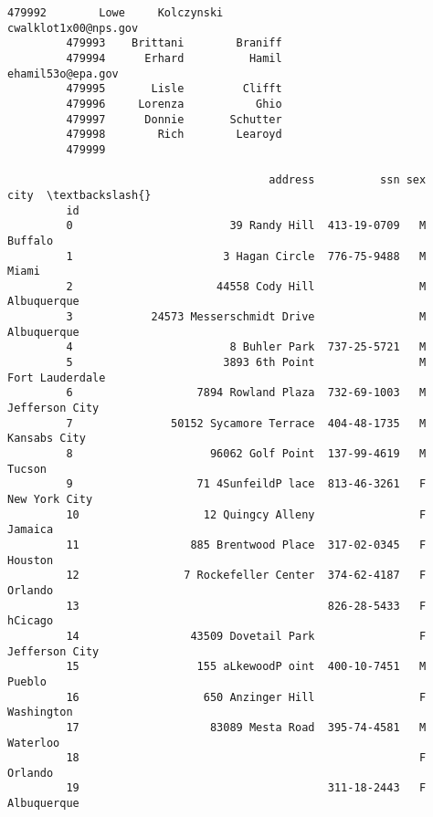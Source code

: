 \documentclass[11pt]{article}
\begin{document}
\begin{Verbatim}[commandchars=\\\{\}]
         479992        Lowe     Kolczynski                      cwalklot1x00@nps.gov   
         479993    Brittani        Braniff                                             
         479994      Erhard          Hamil                         ehamil53o@epa.gov   
         479995       Lisle         Clifft                                             
         479996     Lorenza           Ghio                                             
         479997      Donnie       Schutter                                             
         479998        Rich        Learoyd                                             
         479999                                                                        
         
                                        address          ssn sex              city  \textbackslash{}
         id                                                                          
         0                        39 Randy Hill  413-19-0709   M           Buffalo   
         1                       3 Hagan Circle  776-75-9488   M             Miami   
         2                      44558 Cody Hill                M       Albuquerque   
         3            24573 Messerschmidt Drive                M       Albuquerque   
         4                        8 Buhler Park  737-25-5721   M                     
         5                       3893 6th Point                M   Fort Lauderdale   
         6                   7894 Rowland Plaza  732-69-1003   M    Jefferson City   
         7               50152 Sycamore Terrace  404-48-1735   M      Kansabs City   
         8                     96062 Golf Point  137-99-4619   M            Tucson   
         9                   71 4SunfeildP lace  813-46-3261   F     New York City   
         10                   12 Quingcy Alleny                F           Jamaica   
         11                 885 Brentwood Place  317-02-0345   F           Houston   
         12                7 Rockefeller Center  374-62-4187   F           Orlando   
         13                                      826-28-5433   F           hCicago   
         14                 43509 Dovetail Park                F    Jefferson City   
         15                  155 aLkewoodP oint  400-10-7451   M            Pueblo   
         16                   650 Anzinger Hill                F        Washington   
         17                    83089 Mesta Road  395-74-4581   M          Waterloo   
         18                                                    F           Orlando   
         19                                      311-18-2443   F       Albuquerque   

\end{Verbatim}
\end{document}
